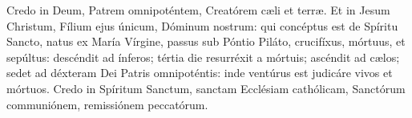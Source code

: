 \documentclass[antiphonaire_ordinaire.tex]{subfiles}
\begin{document}








Credo in Deum, Patrem omnipoténtem, Creatórem cæli et terræ. Et in Jesum Christum, Fílium ejus únicum, Dóminum nostrum: qui concéptus est de Spíritu Sancto, natus ex María Vírgine, passus sub Póntio Piláto, crucifíxus, mórtuus, et sepúltus: descéndit ad ínferos; tértia die resurréxit a mórtuis; ascéndit ad cælos; sedet ad déxteram Dei Patris omnipoténtis: inde ventúrus est judicáre vivos et mórtuos. Credo in Spíritum Sanctum, sanctam Ecclésiam cathólicam, Sanctórum communiónem, remissiónem peccatórum.

\end{document}
